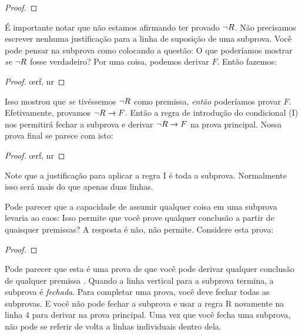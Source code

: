 \begin{proof}
	\open
	\close
\end{proof}

É importante notar que não estamos afirmando ter provado $\neg R$. Não precisamos escrever nenhuma justificação para a linha de suposição de uma subprova. Você pode pensar na subprova como colocando a questão: O que poderíamos mostrar \emph{se} $\neg R$ fosse verdadeiro? Por uma coisa, podemos derivar $F$. Então fazemos:

\begin{proof}
	\open
		\oe{rf, nr}
	\close
\end{proof}

Isso mostrou que \emph{se} tivéssemos $\neg R$ como premissa, \emph{então} poderíamos provar $F$. Efetivamente, provamos $\neg R \rightarrow F$. Então a regra de introdução do condicional ({\eif}I) nos permitirá fechar a subprova e derivar $\neg R \rightarrow F$ na prova principal. Nossa prova final se parece com isto:

\begin{proof}
	\open
		\oe{rf, nr}
	\close
\end{proof}


Note que a justificação para aplicar a regra {\eif}I é toda a subprova. Normalmente isso será mais do que apenas duas linhas.

Pode parecer que a capacidade de assumir qualquer coisa em uma subprova levaria ao caos: Isso permite que você prove qualquer conclusão a partir de quaisquer premissas? A resposta é não, não permite. Considere esta prova:

\begin{proof}
	\open
		 
	\close
\end{proof}

Pode parecer que esta é uma prova de que você pode derivar qualquer conclusão  de qualquer premissa . Quando a linha vertical para a subprova termina, a subprova é \emph{fechada}. Para completar uma prova, você deve fechar todas as subprovas. E você não pode fechar a subprova e usar a regra R novamente na linha 4 para derivar  na prova principal. Uma vez que você fecha uma subprova, não pode se referir de volta a linhas individuais dentro dela.


